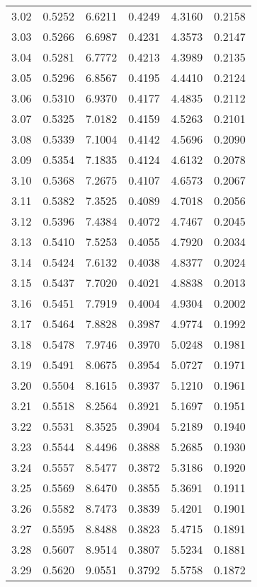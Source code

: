\documentclass{article}
\begin{document}
\begin{longtable}{cccccc}
3.02 & 0.5252 & 6.6211 & 0.4249 & 4.3160 & 0.2158 \\
3.03 & 0.5266 & 6.6987 & 0.4231 & 4.3573 & 0.2147 \\
3.04 & 0.5281 & 6.7772 & 0.4213 & 4.3989 & 0.2135 \\
3.05 & 0.5296 & 6.8567 & 0.4195 & 4.4410 & 0.2124 \\
3.06 & 0.5310 & 6.9370 & 0.4177 & 4.4835 & 0.2112 \\
3.07 & 0.5325 & 7.0182 & 0.4159 & 4.5263 & 0.2101 \\
3.08 & 0.5339 & 7.1004 & 0.4142 & 4.5696 & 0.2090 \\
3.09 & 0.5354 & 7.1835 & 0.4124 & 4.6132 & 0.2078 \\
3.10 & 0.5368 & 7.2675 & 0.4107 & 4.6573 & 0.2067 \\
3.11 & 0.5382 & 7.3525 & 0.4089 & 4.7018 & 0.2056 \\
3.12 & 0.5396 & 7.4384 & 0.4072 & 4.7467 & 0.2045 \\
3.13 & 0.5410 & 7.5253 & 0.4055 & 4.7920 & 0.2034 \\
3.14 & 0.5424 & 7.6132 & 0.4038 & 4.8377 & 0.2024 \\
3.15 & 0.5437 & 7.7020 & 0.4021 & 4.8838 & 0.2013 \\
3.16 & 0.5451 & 7.7919 & 0.4004 & 4.9304 & 0.2002 \\
3.17 & 0.5464 & 7.8828 & 0.3987 & 4.9774 & 0.1992 \\
3.18 & 0.5478 & 7.9746 & 0.3970 & 5.0248 & 0.1981 \\
3.19 & 0.5491 & 8.0675 & 0.3954 & 5.0727 & 0.1971 \\
3.20 & 0.5504 & 8.1615 & 0.3937 & 5.1210 & 0.1961 \\
3.21 & 0.5518 & 8.2564 & 0.3921 & 5.1697 & 0.1951 \\
3.22 & 0.5531 & 8.3525 & 0.3904 & 5.2189 & 0.1940 \\
3.23 & 0.5544 & 8.4496 & 0.3888 & 5.2685 & 0.1930 \\
3.24 & 0.5557 & 8.5477 & 0.3872 & 5.3186 & 0.1920 \\
3.25 & 0.5569 & 8.6470 & 0.3855 & 5.3691 & 0.1911 \\
3.26 & 0.5582 & 8.7473 & 0.3839 & 5.4201 & 0.1901 \\
3.27 & 0.5595 & 8.8488 & 0.3823 & 5.4715 & 0.1891 \\
3.28 & 0.5607 & 8.9514 & 0.3807 & 5.5234 & 0.1881 \\
3.29 & 0.5620 & 9.0551 & 0.3792 & 5.5758 & 0.1872 \\

\end{longtable}
\end{document}
